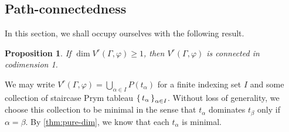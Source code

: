 \documentclass[11pt,reqno]{amsart}
\makeatletter
\newcommand*{\Z}{\mathbb{Z}}
\let\@@pmod\pmod
\DeclareRobustCommand{\pmod}{\@ifstar\@pmods\@@pmod}
\def\@pmods#1{\mkern4mu({\operator@font mod}\mkern 6mu#1)}
\newcommand{\yoav}[1]{{\color{blue} \sf  Yo$\alpha$v: [#1]}}
\theoremstyle{definition}
\theoremstyle{problem}
\theoremstyle{plain}
\newtheorem{proposition}[definition]{Proposition}
\newtheorem{lemma}[definition]{Lemma}
\newtheorem{corollary}[definition]{Corollary}
\theoremstyle{remark}
\theoremstyle{theorem}
\numberwithin{equation}{section}
\numberwithin{figure}{section}
\makeatother
\begin{document}
%
%
%
%
%
  
\subsection{Path-connectedness}
In this section, we shall occupy ourselves with the following result.

\begin{proposition}\label{thm:path}
  If $\dim V^r(\Gamma,\varphi) \geq 1$, then $V^r(\Gamma,\varphi)$ is
  connected in codimension 1.  
\end{proposition}

We may write
$V^r(\Gamma,\varphi) = \bigcup_{\alpha \in I} P(t_\alpha)$ for a
finite indexing set $I$ and some collection of staircase Prym tableau
$\set{t_\alpha}_{\alpha \in I}$.  Without loss of generality, we
choose this collection to be minimal in the sense that $t_{\alpha}$
dominates $t_{\beta}$ only if $\alpha = \beta$.  By
\cref{thm:pure-dim}, we know that each $t_{\alpha}$ is minimal.
\end{document}

